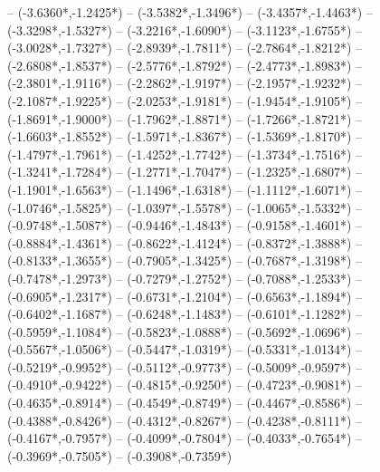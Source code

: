 {	-- ({-3.6360*\dx},{-1.2425*\dy})
	-- ({-3.5382*\dx},{-1.3496*\dy})
	-- ({-3.4357*\dx},{-1.4463*\dy})
	-- ({-3.3298*\dx},{-1.5327*\dy})
	-- ({-3.2216*\dx},{-1.6090*\dy})
	-- ({-3.1123*\dx},{-1.6755*\dy})
	-- ({-3.0028*\dx},{-1.7327*\dy})
	-- ({-2.8939*\dx},{-1.7811*\dy})
	-- ({-2.7864*\dx},{-1.8212*\dy})
	-- ({-2.6808*\dx},{-1.8537*\dy})
	-- ({-2.5776*\dx},{-1.8792*\dy})
	-- ({-2.4773*\dx},{-1.8983*\dy})
	-- ({-2.3801*\dx},{-1.9116*\dy})
	-- ({-2.2862*\dx},{-1.9197*\dy})
	-- ({-2.1957*\dx},{-1.9232*\dy})
	-- ({-2.1087*\dx},{-1.9225*\dy})
	-- ({-2.0253*\dx},{-1.9181*\dy})
	-- ({-1.9454*\dx},{-1.9105*\dy})
	-- ({-1.8691*\dx},{-1.9000*\dy})
	-- ({-1.7962*\dx},{-1.8871*\dy})
	-- ({-1.7266*\dx},{-1.8721*\dy})
	-- ({-1.6603*\dx},{-1.8552*\dy})
	-- ({-1.5971*\dx},{-1.8367*\dy})
	-- ({-1.5369*\dx},{-1.8170*\dy})
	-- ({-1.4797*\dx},{-1.7961*\dy})
	-- ({-1.4252*\dx},{-1.7742*\dy})
	-- ({-1.3734*\dx},{-1.7516*\dy})
	-- ({-1.3241*\dx},{-1.7284*\dy})
	-- ({-1.2771*\dx},{-1.7047*\dy})
	-- ({-1.2325*\dx},{-1.6807*\dy})
	-- ({-1.1901*\dx},{-1.6563*\dy})
	-- ({-1.1496*\dx},{-1.6318*\dy})
	-- ({-1.1112*\dx},{-1.6071*\dy})
	-- ({-1.0746*\dx},{-1.5825*\dy})
	-- ({-1.0397*\dx},{-1.5578*\dy})
	-- ({-1.0065*\dx},{-1.5332*\dy})
	-- ({-0.9748*\dx},{-1.5087*\dy})
	-- ({-0.9446*\dx},{-1.4843*\dy})
	-- ({-0.9158*\dx},{-1.4601*\dy})
	-- ({-0.8884*\dx},{-1.4361*\dy})
	-- ({-0.8622*\dx},{-1.4124*\dy})
	-- ({-0.8372*\dx},{-1.3888*\dy})
	-- ({-0.8133*\dx},{-1.3655*\dy})
	-- ({-0.7905*\dx},{-1.3425*\dy})
	-- ({-0.7687*\dx},{-1.3198*\dy})
	-- ({-0.7478*\dx},{-1.2973*\dy})
	-- ({-0.7279*\dx},{-1.2752*\dy})
	-- ({-0.7088*\dx},{-1.2533*\dy})
	-- ({-0.6905*\dx},{-1.2317*\dy})
	-- ({-0.6731*\dx},{-1.2104*\dy})
	-- ({-0.6563*\dx},{-1.1894*\dy})
	-- ({-0.6402*\dx},{-1.1687*\dy})
	-- ({-0.6248*\dx},{-1.1483*\dy})
	-- ({-0.6101*\dx},{-1.1282*\dy})
	-- ({-0.5959*\dx},{-1.1084*\dy})
	-- ({-0.5823*\dx},{-1.0888*\dy})
	-- ({-0.5692*\dx},{-1.0696*\dy})
	-- ({-0.5567*\dx},{-1.0506*\dy})
	-- ({-0.5447*\dx},{-1.0319*\dy})
	-- ({-0.5331*\dx},{-1.0134*\dy})
	-- ({-0.5219*\dx},{-0.9952*\dy})
	-- ({-0.5112*\dx},{-0.9773*\dy})
	-- ({-0.5009*\dx},{-0.9597*\dy})
	-- ({-0.4910*\dx},{-0.9422*\dy})
	-- ({-0.4815*\dx},{-0.9250*\dy})
	-- ({-0.4723*\dx},{-0.9081*\dy})
	-- ({-0.4635*\dx},{-0.8914*\dy})
	-- ({-0.4549*\dx},{-0.8749*\dy})
	-- ({-0.4467*\dx},{-0.8586*\dy})
	-- ({-0.4388*\dx},{-0.8426*\dy})
	-- ({-0.4312*\dx},{-0.8267*\dy})
	-- ({-0.4238*\dx},{-0.8111*\dy})
	-- ({-0.4167*\dx},{-0.7957*\dy})
	-- ({-0.4099*\dx},{-0.7804*\dy})
	-- ({-0.4033*\dx},{-0.7654*\dy})
	-- ({-0.3969*\dx},{-0.7505*\dy})
	-- ({-0.3908*\dx},{-0.7359*\dy})
}
